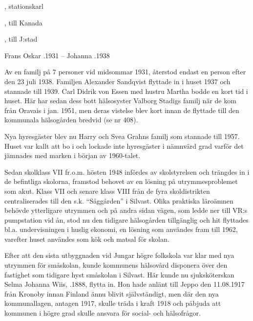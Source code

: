 
\begin{jhchildren}
  \item {}
  \item {}, stationskarl
  \item {}, till Kanada
  \item {}, till J:stad
  \item {}
\end{jhchildren}

Frans Oskar .1931  --  Johanna .1938

Av en familj på 7 personer vid midsommar 1931, återstod endast en person efter den 23 juli 1938. Familjen Alexander Sandqvist flyttade in i huset 1937 och stannade till 1939.  Carl Didrik von Essen med hustru Martha bodde en kort tid i huset. Här har sedan dess bott hälsosyster Valborg Stadigs familj när de kom från Oravais i jan. 1951, men deras vistelse blev kort innan de flyttade till den kommunala hälsogården bredvid (se nr 408).

Nya hyresgäster blev nu Harry och Svea Grahns familj som stannade till 1957. Huset var kallt att bo i och lockade inte hyresgäster i nämnvärd grad varför det jämnades med marken i början av 1960-talet.




Sedan skolklass VII fr.o.m. hösten 1948 infördes av skolstyrelsen och trängdes in i de befintliga skolorna, framstod behovet av en lösning på utrymmesproblemet som akut. Klass VII och senare klass VIII från de fyra skoldistrikten centraliserades till  den s.k. ``Såggården'' i Silvast. Olika praktiska läroämnen behövde ytterligare utrymmen och på andra sidan vägen, som ledde ner till VR:s pumpstation vid ån, stod nu den tidigare hälsogården tillgänglig och hit flyttades bl.a. undervisningen i huslig ekonomi, en lösning som användes fram till 1962, varefter huset användes som kök och matsal för skolan.

Efter att den sista utbyggnaden vid Jungar högre folkskola var klar med nya utrymmen för småskolan, kunde kommunens hälsovård disponera över den fastighet som tidigare hyst småskolan i Silvast. Här kunde nu sjuksköterskan Selma Johanna Wiis, .1888, flytta in. Hon hade anlänt till Jeppo den 11.08.1917 från Kronoby innan Finland ännu blivit självständigt, men där den nya kommunallagen, antagen 1917, skulle träda i kraft 1918 och påbjuda att kommunen i högre grad skulle ansvara för social- och hälsofrågor.

